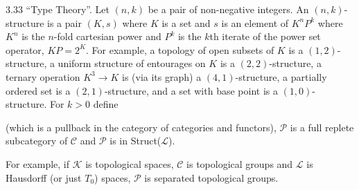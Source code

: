 3.33 “Type Theory”. Let $(n, k)$ be a pair of non-negative integers. An $(n, k)$-structure is a pair $(K, s)$ where $K$ is a set and $s$ is an element of $K^n P^k$ where $K^n$ is the $n$-fold cartesian power and $P^k$ is the $k$th iterate of the power set operator, $KP = 2^K$. For example, a topology of open subsets of $K$ is a $(1, 2)$-structure, a uniform structure of entourages on $K$ is a $(2, 2)$-structure, a ternary operation $K^3 \longrightarrow K$ is (via its graph) a $(4, 1)$-structure, a partially ordered set is a $(2, 1)$-structure, and a set with base point is a $(1, 0)$-structure. For $k > 0$ define

(which is a pullback in the category of categories and functors), $\mathcal{P}$ is a full replete subcategory of $\mathcal{C}$ and $\mathcal{P}$ is in Struct($\mathcal{L}$).

For example, if $\mathcal{K}$ is topological spaces, $\mathcal{C}$ is topological groups and $\mathcal{L}$ is Hausdorff (or just $T_0$) spaces, $\mathcal{P}$ is separated topological groups.